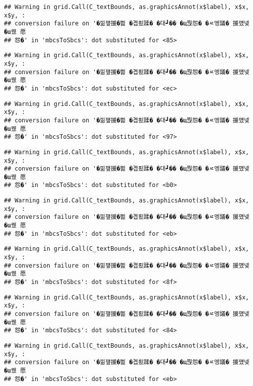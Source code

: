 \documentclass[
]{article}
\begin{document}
\begin{verbatim}
## Warning in grid.Call(C_textBounds, as.graphicsAnnot(x$label), x$x, x$y, :
## conversion failure on '�낆쟾援�쁾 �곕룄蹂� �대┛�� �щ쭩怨� �ㅼ엥議� 援먰넻�ш퀬 愿
## 怨�' in 'mbcsToSbcs': dot substituted for <85>
\end{verbatim}

\begin{verbatim}
## Warning in grid.Call(C_textBounds, as.graphicsAnnot(x$label), x$x, x$y, :
## conversion failure on '�낆쟾援�쁾 �곕룄蹂� �대┛�� �щ쭩怨� �ㅼ엥議� 援먰넻�ш퀬 愿
## 怨�' in 'mbcsToSbcs': dot substituted for <ec>
\end{verbatim}

\begin{verbatim}
## Warning in grid.Call(C_textBounds, as.graphicsAnnot(x$label), x$x, x$y, :
## conversion failure on '�낆쟾援�쁾 �곕룄蹂� �대┛�� �щ쭩怨� �ㅼ엥議� 援먰넻�ш퀬 愿
## 怨�' in 'mbcsToSbcs': dot substituted for <97>
\end{verbatim}

\begin{verbatim}
## Warning in grid.Call(C_textBounds, as.graphicsAnnot(x$label), x$x, x$y, :
## conversion failure on '�낆쟾援�쁾 �곕룄蹂� �대┛�� �щ쭩怨� �ㅼ엥議� 援먰넻�ш퀬 愿
## 怨�' in 'mbcsToSbcs': dot substituted for <b0>
\end{verbatim}

\begin{verbatim}
## Warning in grid.Call(C_textBounds, as.graphicsAnnot(x$label), x$x, x$y, :
## conversion failure on '�낆쟾援�쁾 �곕룄蹂� �대┛�� �щ쭩怨� �ㅼ엥議� 援먰넻�ш퀬 愿
## 怨�' in 'mbcsToSbcs': dot substituted for <eb>
\end{verbatim}

\begin{verbatim}
## Warning in grid.Call(C_textBounds, as.graphicsAnnot(x$label), x$x, x$y, :
## conversion failure on '�낆쟾援�쁾 �곕룄蹂� �대┛�� �щ쭩怨� �ㅼ엥議� 援먰넻�ш퀬 愿
## 怨�' in 'mbcsToSbcs': dot substituted for <8f>
\end{verbatim}

\begin{verbatim}
## Warning in grid.Call(C_textBounds, as.graphicsAnnot(x$label), x$x, x$y, :
## conversion failure on '�낆쟾援�쁾 �곕룄蹂� �대┛�� �щ쭩怨� �ㅼ엥議� 援먰넻�ш퀬 愿
## 怨�' in 'mbcsToSbcs': dot substituted for <84>
\end{verbatim}

\begin{verbatim}
## Warning in grid.Call(C_textBounds, as.graphicsAnnot(x$label), x$x, x$y, :
## conversion failure on '�낆쟾援�쁾 �곕룄蹂� �대┛�� �щ쭩怨� �ㅼ엥議� 援먰넻�ш퀬 愿
## 怨�' in 'mbcsToSbcs': dot substituted for <eb>
\end{verbatim}
\end{document}
